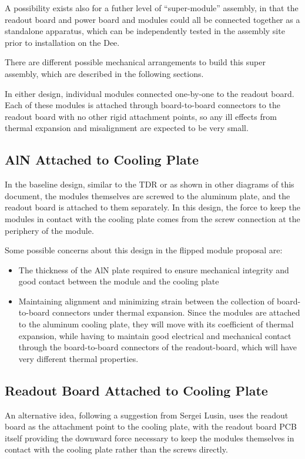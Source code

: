 \documentclass[11pt]{article}
\begin{document}
A possibility exists also for a futher level of ``super-module'' assembly, in that the readout board and power board and modules could all be connected together as a standalone apparatus, which can be independently tested in the assembly site prior to installation on the Dee.

There are different possible mechanical arrangements to build this super assembly, which are described in the following sections.

In either design, individual modules connected one-by-one to the readout board.
Each of these modules is attached through board-to-board connectors to the readout board with no other rigid attachment points, so any ill effects from thermal expansion and misalignment are expected to be very small.

\subsection{AlN Attached to Cooling Plate}

In the baseline design, similar to the TDR or as shown in other diagrams of this document, the modules themselves are screwed to the aluminum plate, and the readout board is attached to them separately. In this design, the force to keep the modules in contact with the cooling plate comes from the screw connection at the periphery of the module.

Some possible concerns about this design in the flipped module proposal are:
\begin{itemize}
  \item The thickness of the AlN plate required to ensure mechanical integrity and good contact between the module and the cooling plate
  \item Maintaining alignment and minimizing strain between the collection of board-to-board connectors under thermal expansion. Since the modules are attached to the aluminum cooling plate, they will move with its coefficient of thermal expansion, while having to maintain good electrical and mechanical contact through the board-to-board connectors of the readout-board, which will have very different thermal properties.
\end{itemize}

\subsection{Readout Board Attached to Cooling Plate}

An alternative idea, following a suggestion from Sergei Lusin, uses the readout board as the attachment point to the cooling plate, with the readout board PCB itself providing the downward force necessary to keep the modules themselves in contact with the cooling plate rather than the screws directly.
\end{document}
